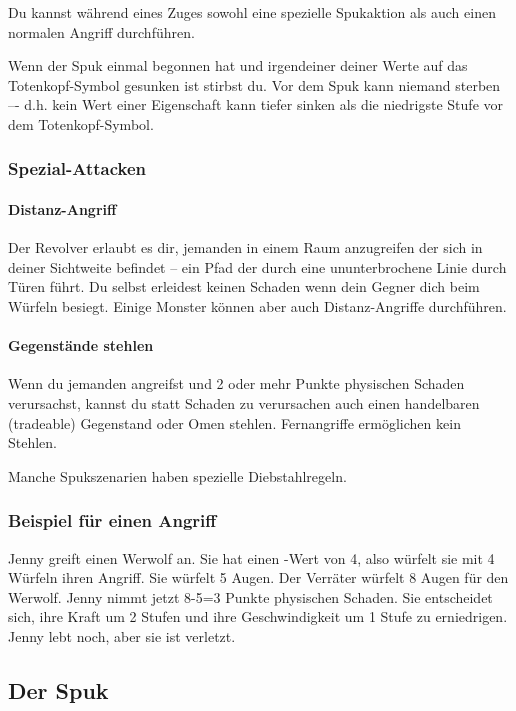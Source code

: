 Du kannst während eines Zuges sowohl eine spezielle Spukaktion als auch einen normalen Angriff durchführen.

Wenn der Spuk einmal begonnen hat und irgendeiner deiner Werte auf das Totenkopf-Symbol gesunken ist stirbst du. Vor dem Spuk kann niemand sterben –- d.h. kein Wert einer Eigenschaft kann tiefer sinken als die niedrigste Stufe vor dem Totenkopf-Symbol.



\subsubsection{Spezial-Attacken}
\label{kap:rule:specialattack}

\paragraph{Distanz-Angriff} Der Revolver erlaubt es dir, jemanden in einem Raum anzugreifen der sich in deiner Sichtweite befindet – ein Pfad der durch eine ununterbrochene Linie durch Türen führt. Du selbst erleidest keinen Schaden wenn dein Gegner dich beim Würfeln besiegt. Einige Monster können aber auch Distanz-Angriffe durchführen.

\paragraph{Gegenstände stehlen} Wenn du jemanden angreifst und 2 oder mehr Punkte physischen Schaden verursachst, kannst du statt Schaden zu verursachen auch einen handelbaren (tradeable) Gegenstand oder Omen stehlen. Fernangriffe ermöglichen kein Stehlen.

Manche Spukszenarien haben spezielle Diebstahlregeln.

\subsubsection{Beispiel für einen Angriff}

Jenny greift einen Werwolf an. Sie hat einen \might-Wert von 4, also würfelt sie mit 4 Würfeln ihren Angriff. Sie würfelt 5 Augen. Der Verräter würfelt 8 Augen für den Werwolf. Jenny nimmt jetzt 8-5=3 Punkte physischen Schaden. Sie entscheidet sich, ihre Kraft um 2 Stufen und ihre Geschwindigkeit um 1 Stufe zu erniedrigen. Jenny lebt noch, aber sie ist verletzt.

\subsection{Der Spuk}
\label{kap:rule:haunt}

